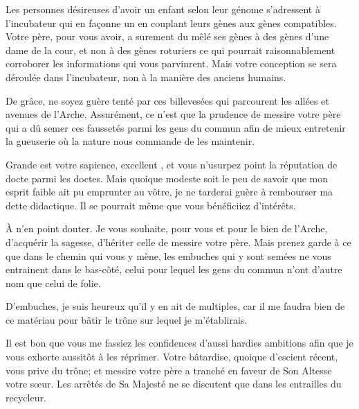 \begin{drama}
  Les personnes désireuses d’avoir un enfant selon leur génome s’adressent à l’incubateur qui en façonne un en couplant leurs gènes aux gènes compatibles. Votre père, pour vous avoir, a surement du mêlé ses gènes à des gènes d’une dame de la cour, et non à des gènes roturiers ce qui pourrait raisonnablement corroborer les informations qui vous parvinrent. Mais votre conception se sera déroulée dans l’incubateur, non à la manière des anciens humains.

  De grâce, ne soyez guère tenté par ces billevesées qui parcourent les allées et avenues de l’Arche. Assurément, ce n’est que la prudence de messire votre père qui a dû semer ces faussetés parmi les gens du commun afin de mieux entretenir la gueuserie où la nature nous commande de les maintenir.

  \elenaspeaks Grande est votre sapience, excellent \alexas{}, et vous n’usurpez point la réputation de docte parmi les doctes. Mais quoique modeste soit le peu de savoir que mon esprit faible ait pu emprunter au vôtre, je ne tarderai guère à rembourser ma dette didactique. Il se pourrait même que vous bénéficiiez d’intérêts.

  \alexasspeaks À n’en point douter. Je vous souhaite, pour vous et pour le bien de l’Arche, d’acquérir la sagesse, d’hériter celle de messire votre père. Mais prenez garde à ce que dans le chemin qui vous y mène, les embuches qui y sont semées  ne vous entrainent dans le bas-côté, celui pour lequel les gens du commun n’ont d’autre nom que celui de folie. 

  \elenaspeaks D’embuches, %
  je suis heureux qu’il y en ait de multiples, car %
  il me faudra bien de ce matériau pour bâtir le trône sur lequel je m’établirais.

  \alexasspeaks Il est bon que vous me fassiez les confidences d’aussi hardies ambitions afin que je vous exhorte aussitôt à les réprimer. Votre bâtardise, quoique d’escient récent, vous prive du trône; et messire votre père a tranché en faveur de Son Altesse votre sœur. Les arrêtés de Sa Majesté ne se discutent que dans les entrailles du recycleur.


\end{drama}
